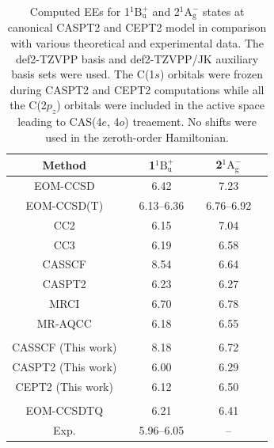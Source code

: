\documentclass[aip,jcp,amsmath,twocolumn,floatfix,reprint,fleqn]{revtex4-1}
\begin{document}
\clearpage

{
\begin{longtable}[!ht]{cccccc}
  \caption{\label{tab:butadiene}
    Computed EEs for 1${}^1\text{B}_\text{u}^{+}$ and 2${}^1\text{A}_\text{g}^{-}$ states at canonical CASPT2 and CEPT2 model in comparison with various theoretical and experimental data.
    The def2-TZVPP basis and def2-TZVPP/JK auxiliary basis sets were used.
    The C(1$s$) orbitals were frozen during CASPT2 and CEPT2 computations while all the C(2$p_z$) orbitals were included in the active space leading to CAS(4$e$, 4$o$) treaement.
    No shifts were used in the zeroth-order Hamiltonian.
}
\\
\hline
\hline
Method && 1${}^1\text{B}_\text{u}^{+}$ && 2${}^1\text{A}_\text{g}^{-}$ \\
\hline

EOM-CCSD\cite{doi:10.1063/1.471988}    && 6.42       && 7.23       \\
EOM-CCSD(T)\cite{doi:10.1063/1.471988} && 6.13--6.36 && 6.76--6.92 \\
CC2\cite{doi:10.1063/1.3158990}        && 6.15       && 7.04       \\
CC3\cite{doi:10.1063/1.3158990}        && 6.19       && 6.58       \\
CASSCF\cite{doi:10.1063/1.465071}      && 8.54       && 6.64       \\
CASPT2\cite{doi:10.1063/1.465071}      && 6.23       && 6.27       \\
MRCI\cite{SZALAY1989219}               && 6.70       && 6.78       \\
MR-AQCC\cite{Dallos2004}               && 6.18       && 6.55       \\
\\
CASSCF (This work)      && 8.18       && 6.72       \\
CASPT2 (This work)      && 6.00       && 6.29       \\
CEPT2 (This work)       && 6.12       && 6.50       \\
\\
EOM-CCSDTQ\cite{doi:10.1021/ct300591z} && 6.21       && 6.41 \\
Exp.\cite{doi:10.1063/1.440587}        && 5.96--6.05 && --   \\
\hline
\hline
\end{longtable}

}
\end{document}
